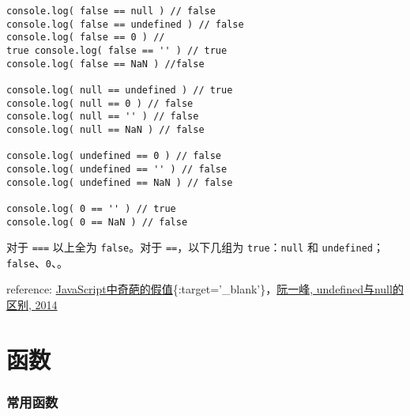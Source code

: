 \begin{verbatim}
console.log( false == null ) // false
console.log( false == undefined ) // false 
console.log( false == 0 ) //
true console.log( false == '' ) // true 
console.log( false == NaN ) //false

console.log( null == undefined ) // true 
console.log( null == 0 ) // false 
console.log( null == '' ) // false 
console.log( null == NaN ) // false

console.log( undefined == 0 ) // false 
console.log( undefined == '' ) // false 
console.log( undefined == NaN ) // false

console.log( 0 == '' ) // true 
console.log( 0 == NaN ) // false 
\end{verbatim}

对于 \texttt{===} 以上全为 \texttt{false}。对于 \texttt{==}，以下几组为
\texttt{true}：\texttt{null} 和
\texttt{undefined}；\texttt{false}、\texttt{0}、\texttt{\textquotesingle{}\textquotesingle{}}。

reference:
\href{http://www.cnblogs.com/snandy/p/3589517.html}{JavaScript中奇葩的假值}\{:target='\_blank'\}，\href{http://www.ruanyifeng.com/blog/2014/03/undefined-vs-null.html}{阮一峰,
undefined与null的区别, 2014}

\section{函数}\label{ux51fdux6570}

\subsubsection{常用函数}\label{ux5e38ux7528ux51fdux6570}

